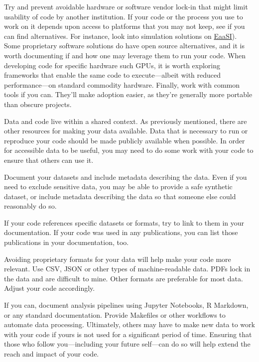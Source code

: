 \documentclass[10pt,letterpaper]{article}
\begin{document}
Try and prevent avoidable hardware or software vendor lock-in
that might limit usability of code by another institution.
If your code or the process you use to work on it
depends upon access to platforms that you may not keep,
see if you can find alternatives.
For instance,
look into simulation solutions on
\href{https://www.softwarepreservationnetwork.org/emulation-as-a-service-infrastructure/}{EaaSI}).
Some proprietary software solutions do have open source alternatives,
and it is worth documenting if and how one may leverage them to run your code.
When developing code for specific hardware such GPUs,
it is worth exploring frameworks that enable the same code to execute---albeit
with reduced performance---on standard commodity hardware.
Finally,
work with common tools if you can.
They'll make adoption easier,
as they're generally more portable than obscure projects.

Data and code live within a shared context.
As previously mentioned, there are other resources for making your data available.
Data that is necessary to run or reproduce your code should be made publicly available when possible.
In order for accessible data to be useful,
you may need to do some work with your code to ensure that others can use it.

Document your datasets and include metadata describing the data.
Even if you need to exclude sensitive data,
you may be able to provide a safe synthetic dataset,
or include metadata describing the data so that someone else could reasonably do so.

If your code references specific datasets or formats,
try to link to them in your documentation.
If your code was used in any publications,
you can list those publications in your documentation, too.

Avoiding proprietary formats for your data will help make your code more relevant.
Use CSV, JSON or other types of machine-readable data.
PDFs lock in the data and are difficult to mine.
Other formats are preferable for most data.
Adjust your code accordingly.

If you can, document analysis pipelines using Jupyter Notebooks,
R Markdown,
or any standard documentation.
Provide Makefiles or other workflows to automate data processing.
Ultimately,
others may have to make new data to work with your code if yours is not used for a significant period of time.
Ensuring that those who follow you---including your future self---can do so
will help extend the reach and impact of your code.
\end{document}
